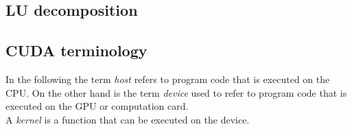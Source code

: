 \subsection*{LU decomposition}


\subsection*{CUDA terminology}
In the following the term \emph{host} refers to program code that is executed on the CPU. On the other hand is the term \emph{device} used to refer to program code that is executed on the GPU or computation card.\\
A \emph{kernel} is a function that can be executed on the device.

